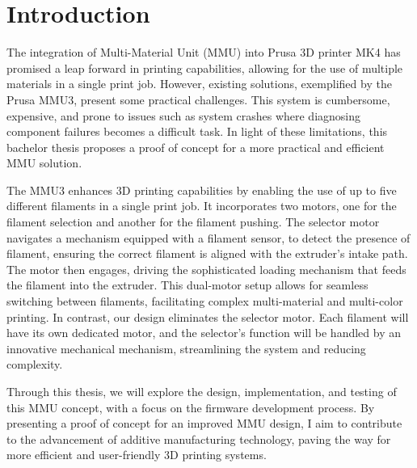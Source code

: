 \chapter*{Introduction}

The integration of Multi-Material Unit (MMU) into Prusa 3D printer MK4 has promised a leap forward in printing capabilities, allowing for the use of multiple materials in a single print job. However, existing solutions, exemplified by the Prusa MMU3, present some practical challenges. This system is cumbersome, expensive, and prone to issues such as system crashes where diagnosing component failures becomes a difficult task. In light of these limitations, this bachelor thesis proposes a proof of concept for a more practical and efficient MMU solution.

The MMU3 enhances 3D printing capabilities by enabling the use of up to five different filaments in a single print job. It incorporates two motors, one for the filament selection and another for the filament pushing. The selector motor navigates a mechanism equipped with a filament sensor, to detect the presence of filament, ensuring the correct filament is aligned with the extruder’s intake path. The motor then engages, driving the sophisticated loading mechanism that feeds the filament into the extruder. This dual-motor setup allows for seamless switching between filaments, facilitating complex multi-material and multi-color printing.
In contrast, our design eliminates the selector motor. Each filament will have its own dedicated motor, and the selector's function will be handled by an innovative mechanical mechanism, streamlining the system and reducing complexity.

Through this thesis, we will explore the design, implementation, and testing of this MMU concept, with a focus on the firmware development process. By presenting a proof of concept for an improved MMU design, I aim to contribute to the advancement of additive manufacturing technology, paving the way for more efficient and user-friendly 3D printing systems.

